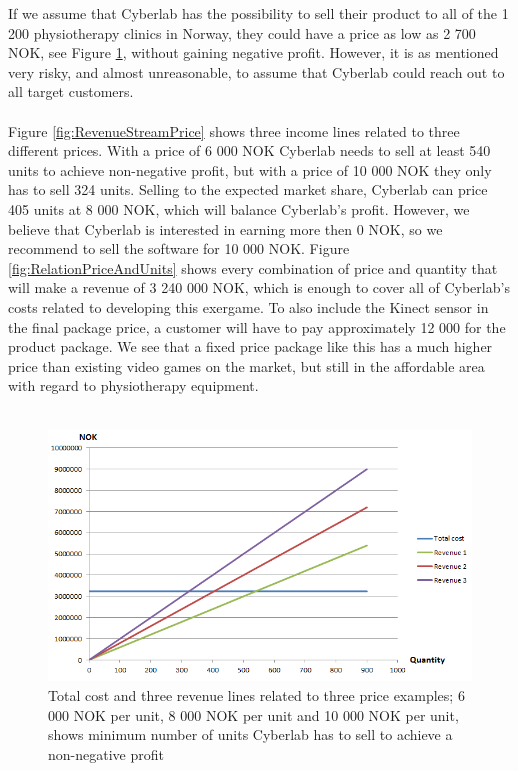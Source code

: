 If we assume that Cyberlab has the possibility to sell their product to all of the 1 200 physiotherapy clinics in Norway, they could have a price as low as 2 700 NOK, see Figure \ref{fig:RevenueStreamQuantity}, without gaining negative profit. However, it is as mentioned very risky, and almost unreasonable, to assume that Cyberlab could reach out to all target customers. \\ \\
Figure \ref{fig:RevenueStreamPrice} shows three income lines related to three different prices. With a price of 6 000 NOK Cyberlab needs to sell at least 540 units to achieve non-negative profit, but with a price of 10 000 NOK they only has to sell 324 units. Selling to the expected market share, Cyberlab can price 405 units at 8 000 NOK, which will balance Cyberlab's profit. However, we believe that Cyberlab is interested in earning more then 0 NOK, so we recommend to sell the software for 10 000 NOK. Figure \ref{fig:RelationPriceAndUnits} shows every combination of price and quantity that will make a revenue of 3 240 000 NOK, which is enough to cover all of Cyberlab's costs related to developing this exergame. To also include the Kinect sensor in the final package price, a customer will have to pay approximately 12 000 for the product package. We see that a fixed price package like this has a much higher price than existing video games on the market, but still in the affordable area with regard to physiotherapy equipment.\\ \\
\begin{figure}
\begin{center}
\includegraphics[scale=0.7]{revenuestreamquantity}
\caption[Quantity examples]{Total cost and three revenue lines related to three price examples; 6 000 NOK per unit, 8 000 NOK per unit and 10 000 NOK per unit, shows minimum number of units Cyberlab has to sell to achieve a non-negative profit}
\label{fig:RevenueStreamQuantity}
\end{center}
\end{figure}

